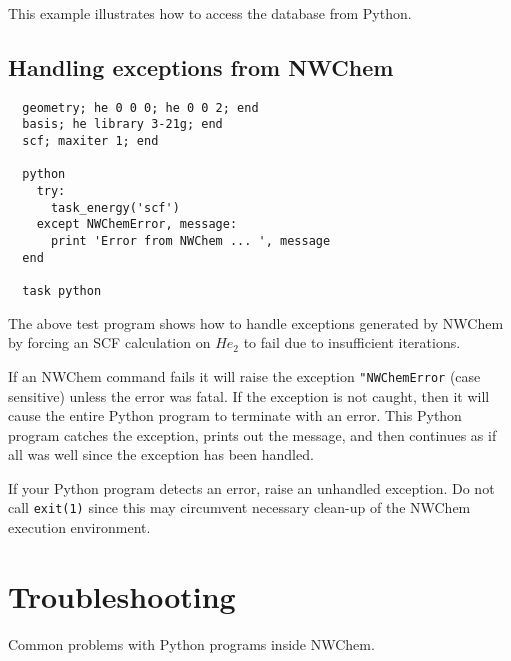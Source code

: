 This example illustrates how to access the database from Python.

\subsection{Handling exceptions from NWChem}

\begin{verbatim}
  geometry; he 0 0 0; he 0 0 2; end
  basis; he library 3-21g; end
  scf; maxiter 1; end

  python
    try:
      task_energy('scf')
    except NWChemError, message:
      print 'Error from NWChem ... ', message
  end

  task python
\end{verbatim}

The above test program shows how to handle exceptions generated by
NWChem by forcing an SCF calculation on $He_2$ to fail due to
insufficient iterations.

If an NWChem command fails it will raise the exception
\verb+"NWChemError+ (case sensitive) unless the error was fatal.
If the exception is not caught, then it will cause the entire Python
program to terminate with an error.  This Python program catches the
exception, prints out the message, and then continues as if all was
well since the exception has been handled.  

If your Python program detects an error, raise an unhandled
exception.  Do not call \verb+exit(1)+ since this may circumvent
necessary clean-up of the NWChem execution environment.

\section{Troubleshooting}

Common problems with Python programs inside NWChem.

